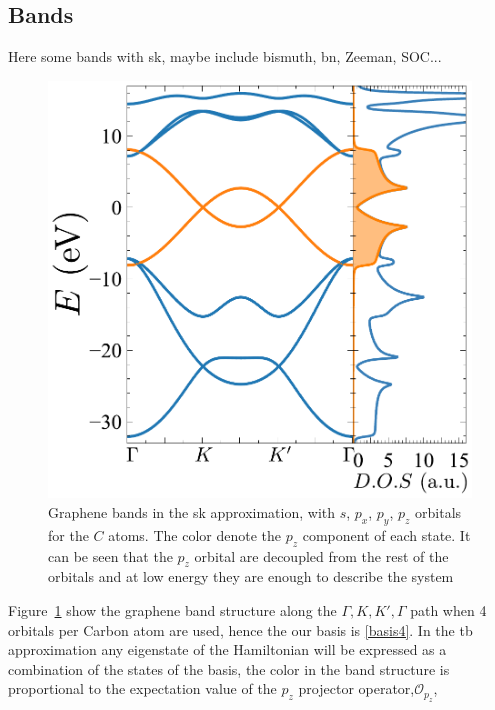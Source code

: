 
\subsection{Bands}
Here some bands with \ac{sk}, maybe include bismuth, \ac{bn}, Zeeman, SOC...
\begin{figure}[h!]
\centering
\includegraphics{graphene/figures/banddos.pdf}
\vspace{-5pt}
\caption{Graphene bands in the \ac{sk} approximation, with $s$, $p_x$, $p_y$, $p_z$ orbitals for the $C$ atoms. The color denote the $p_z$ component of each state. It can be seen that the $p_z$ orbital are decoupled from the rest of the orbitals and at low energy they are enough to describe the system}
\label{Gbands}
\end{figure}
\FloatBarrier
Figure~\ref{Gbands} show the graphene band structure along the $\Gamma,K,K',\Gamma$ path when 4 orbitals per Carbon atom are used, hence the our basis is \eqref{basis4}. In the \ac{tb} approximation any eigenstate of the Hamiltonian will be expressed as a combination of the states of the basis, the color in the band structure is proportional to the expectation value of the $p_z$ projector operator,$\mathcal{O}_{p_z}$,
